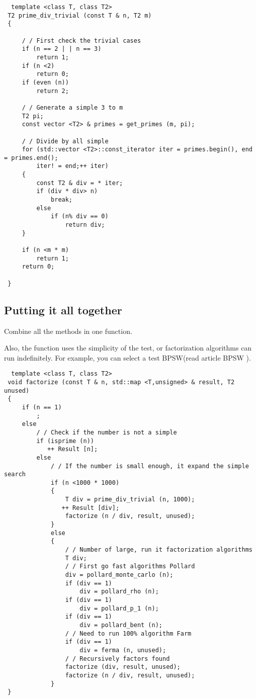\begin{verbatim}  template <class T, class T2>
 T2 prime_div_trivial (const T & n, T2 m)
 {
    
     / / First check the trivial cases
     if (n == 2 | | n == 3)
         return 1;
     if (n <2)
         return 0;
     if (even (n))
         return 2;

     / / Generate a simple 3 to m
     T2 pi;
     const vector <T2> & primes = get_primes (m, pi);

     / / Divide by all simple
     for (std::vector <T2>::const_iterator iter = primes.begin(), end = primes.end();
         iter! = end;++ iter)
     {
         const T2 & div = * iter;
         if (div * div> n)
             break;
         else
             if (n% div == 0)
                 return div;
     }
    
     if (n <m * m)
         return 1;
     return 0;

 } 
\end{verbatim}\subsection{ Putting it all together }
Combine all the methods in one function.

Also, the function uses the simplicity of the test, or factorization algorithms can run indefinitely. For example, you can select a test BPSW(read article BPSW ).

\begin{verbatim}  template <class T, class T2>
 void factorize (const T & n, std::map <T,unsigned> & result, T2 unused)
 {
     if (n == 1)
         ;
     else
         / / Check if the number is not a simple
         if (isprime (n))
            ++ Result [n];
         else
             / / If the number is small enough, it expand the simple search
             if (n <1000 * 1000)
             {
                 T div = prime_div_trivial (n, 1000);
                ++ Result [div];
                 factorize (n / div, result, unused);
             }
             else
             {
                 / / Number of large, run it factorization algorithms
                 T div;
                 / / First go fast algorithms Pollard
                 div = pollard_monte_carlo (n);
                 if (div == 1)
                     div = pollard_rho (n);
                 if (div == 1)
                     div = pollard_p_1 (n);
                 if (div == 1)
                     div = pollard_bent (n);
                 / / Need to run 100% algorithm Farm
                 if (div == 1)
                     div = ferma (n, unused);
                 / / Recursively factors found
                 factorize (div, result, unused);
                 factorize (n / div, result, unused);
             }
 } 
\end{verbatim}
